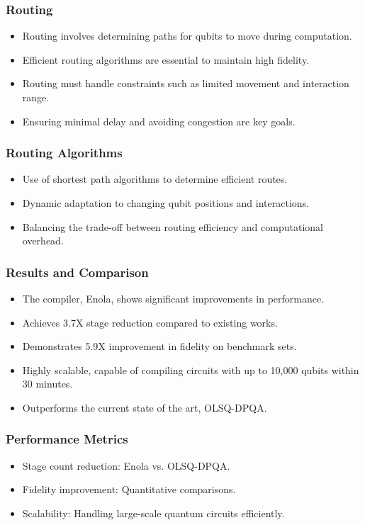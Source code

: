 \documentclass[18 pt]{beamer}
\begin{document}
\begin{frame}
    \frametitle{Routing}
    \begin{itemize}
        \item Routing involves determining paths for qubits to move during computation.
        \item Efficient routing algorithms are essential to maintain high fidelity.
        \item Routing must handle constraints such as limited movement and interaction range.
        \item Ensuring minimal delay and avoiding congestion are key goals.
    \end{itemize}
\end{frame}

\begin{frame}
    \frametitle{Routing Algorithms}
    \begin{itemize}
        \item Use of shortest path algorithms to determine efficient routes.
        \item Dynamic adaptation to changing qubit positions and interactions.
        \item Balancing the trade-off between routing efficiency and computational overhead.
    \end{itemize}
\end{frame}

\begin{frame}
    \frametitle{Results and Comparison}
    \begin{itemize}
        \item The compiler, Enola, shows significant improvements in performance.
        \item Achieves 3.7X stage reduction compared to existing works.
        \item Demonstrates 5.9X improvement in fidelity on benchmark sets.
        \item Highly scalable, capable of compiling circuits with up to 10,000 qubits within 30 minutes.
        \item Outperforms the current state of the art, OLSQ-DPQA.
    \end{itemize}
\end{frame}

\begin{frame}
    \frametitle{Performance Metrics}
    \begin{itemize}
        \item Stage count reduction: Enola vs. OLSQ-DPQA.
        \item Fidelity improvement: Quantitative comparisons.
        \item Scalability: Handling large-scale quantum circuits efficiently.
    \end{itemize}
\end{frame}
\end{document}
